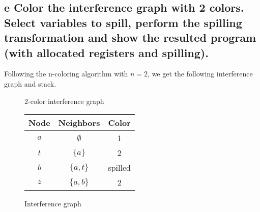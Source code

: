 \documentclass[11pt,a4paper]{article}
\begin{document}
\subsection*{e \mdseries Color the interference graph with 2 colors. Select
variables to spill, perform the spilling transformation and show the resulted
program (with allocated registers and spilling).}
Following the n-coloring algorithm with $n = 2$, we get the following
interference graph and stack.
\begin{multicols}{2}

	\begin{figure}[H]

		\center

		\label{fig:2-color-interference-graph}
		\caption{2-color interference graph}

	\end{figure}

	\vfill
	\columnbreak

	\begin{figure}[H]

		\center
		\begin{tabular}{|c|c|c|}
			\hline
			{\bf Node}	& {\bf Neighbors}	& {\bf Color}			\\ \hline
			$a$			& $\emptyset$		& {\color{red}		1}	\\ \hline
			$t$			& $\{a\}$			& {\color{blue}		2}	\\ \hline
			$b$			& $\{a,t\}$			& spilled				\\ \hline
			$z$			& $\{a,b\}$			& {\color{blue}		2}	\\ \hline
		\end{tabular}

		\label{fig:interference graph}
		\caption{Interference graph}

	\end{figure}

\end{multicols}
\end{document}
